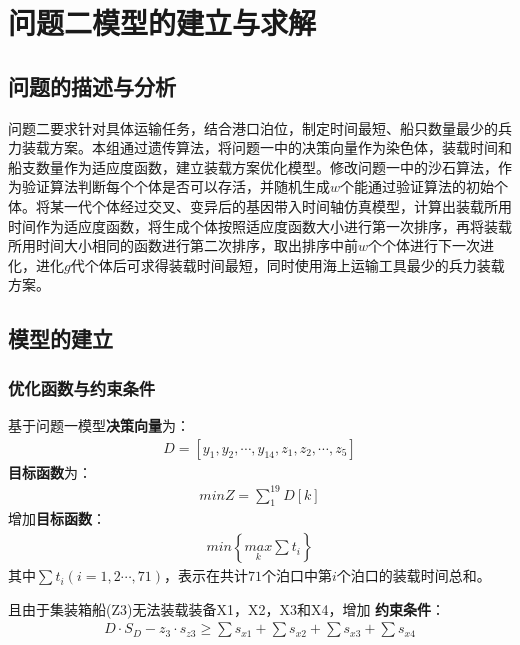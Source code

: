 \documentclass{whutmod}
\begin{document}
	
		
	\section{问题二模型的建立与求解}
	\subsection{问题的描述与分析}

	问题二要求针对具体运输任务，结合港口泊位，制定时间最短、船只数量最少的兵力装载方案。本组通过遗传算法，将问题一中的决策向量作为染色体，装载时间和船支数量作为适应度函数，建立装载方案优化模型。修改问题一中的沙石算法，作为验证算法判断每个个体是否可以存活，并随机生成$w$个能通过验证算法的初始个体。将某一代个体经过交叉、变异后的基因带入时间轴仿真模型，计算出装载所用时间作为适应度函数，将生成个体按照适应度函数大小进行第一次排序，再将装载所用时间大小相同的函数进行第二次排序，取出排序中前$w$个个体进行下一次进化，进化$g$代个体后可求得装载时间最短，同时使用海上运输工具最少的兵力装载方案。	                                                                                                   
	\subsection{模型的建立}
	    \subsubsection{优化函数与约束条件}
	基于问题一模型\textbf{决策向量}为：
	\begin{gather*}
	D=[y_{1},y_{2},\cdots,y_{14},z_{1},z_{2},\cdots,z_{5}]
	\end{gather*}
	\textbf{目标函数}为：
	\begin{gather}
	min Z=\sum _{1}^{19}D[k]
	\end{gather}
	增加\textbf{目标函数}：
		\begin{gather}
	min \left \{ \underset{k}{max}\sum t_{i} \right \}
	\end{gather}
	其中$\sum t_{i}(i=1,2\cdots,71)$，表示在共计$71$个泊口中第$i$个泊口的装载时间总和。	
	
	且由于集装箱船(Z3)无法装载装备X1，X2，X3和X4，增加	\textbf{约束条件}：
	\begin{gather}
	D \cdot S_{D} - z_{3} \cdot s_{z3} \geq  \sum s_{x1}+ \sum s_{x2}+\sum s_{x3}+ \sum s_{x4}
	\end{gather}
	
\end{document}
